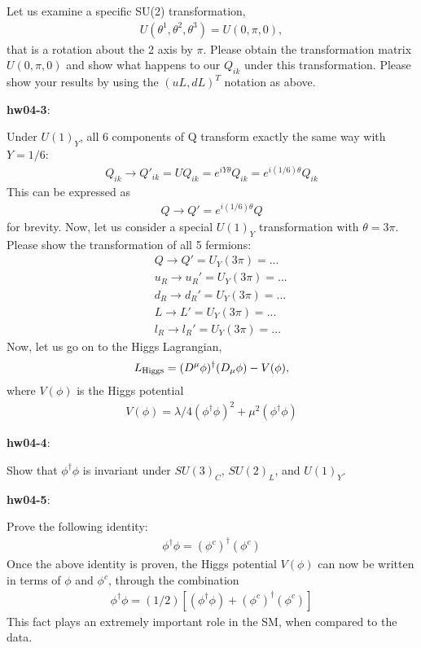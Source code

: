 \documentclass[12pt]{article}
\begin{document}
  Let us examine a specific SU(2) transformation,
\begin{eqnarray}
    U(\theta^1,\theta^2,\theta^3) = U(0,\pi,0),
\end{eqnarray}
    that is a rotation about the 2 axis by $\pi$.
  Please obtain the transformation matrix
  $U(0,\pi,0)$
  and show what happens to our $Q_{ik}$ under
  this transformation.  Please show your results
  by using the $(uL, dL)^T$ notation as above.

{\bf hw04-3}:

  Under $U(1)_Y$, all 6 components of Q transform
  exactly the same way with $Y=1/6$:
\begin{eqnarray}
    Q_{ik} \to Q'_{ik} = U Q_{ik}
                   = e^{iY\theta} Q_{ik}
                   = e^{i(1/6)\theta} Q_{ik}
\end{eqnarray}
    This can be expressed as
\begin{eqnarray}
    Q \to Q' = e^{i(1/6)\theta} Q
\end{eqnarray}
    for brevity.  Now, let us consider a special
  $U(1)_Y$ transformation with $\theta=3\pi$.
  Please show the transformation of all 5 fermions:
\begin{eqnarray}
    &&  Q \to Q'  = U_Y(3\pi) = ...\\
    && u_R \to u_R' = U_Y(3\pi) = ...\\
    && d_R \to d_R' = U_Y(3\pi) = ...\\
    && L  \to L'  = U_Y(3\pi) = ...\\
    && l_R \to l_R' = U_Y(3\pi) = ...
\end{eqnarray}
 Now, let us go on to the Higgs Lagrangian,
\begin{eqnarray}
    L_{\rm Higgs}
  = (D^\mu \phi)^\dagger (D_\mu \phi) - V(\phi),
\end{eqnarray}
  where $V(\phi)$ is the Higgs potential
\begin{eqnarray}
    V(\phi)
  =
  \lambda/4 (\phi^\dagger \phi)^2 + \mu^2 (\phi^\dagger \phi)
\end{eqnarray}
  

{\bf hw04-4}:

  Show that $\phi^\dagger \phi$ is invariant under
  $SU(3)_C$, $SU(2)_L$, and $U(1)_Y$.

{\bf hw04-5}:

  Prove the following identity:
\begin{eqnarray}
    \phi^\dagger \phi = (\phi^c)^\dagger (\phi^c)
\end{eqnarray}
   Once the above identity is proven, the Higgs potential $V(\phi)$
  can now be written in terms of $\phi$ and $\phi^c$, through
  the combination
  \begin{eqnarray}
    \phi^\dagger \phi
    =
    (1/2)[(\phi^\dagger \phi)+(\phi^c)^\dagger (\phi^c)]
  \end{eqnarray}
  This fact plays an extremely important role in the SM,
  when compared to the data.
\end{document}
